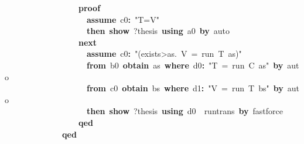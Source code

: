 \documentclass{article}
\newcommand{\syntaxKEYWORDA}[1]{\textcolor[rgb]{0.0,0.4,0.6}{\textbf{#1}}}
\newcommand{\syntaxKEYWORDB}[1]{\textcolor[rgb]{0.0,0.6,0.4}{\textbf{#1}}}
\newcommand{\syntaxKEYWORDC}[1]{\textcolor[rgb]{0.0,0.6,1.0}{\textbf{#1}}}
\newcommand{\syntaxLITERALA}[1]{\textcolor[rgb]{1.0,0.0,0.8}{#1}}
\newcommand{\syntaxOPERATOR}[1]{\textcolor[rgb]{0.0,0.0,0.0}{\textbf{#1}}}
\newcommand{\syntaxKEYWORDA}[1]{\textcolor[rgb]{0.0,0.4,0.6}{\textbf{#1}}}
\newcommand{\syntaxKEYWORDB}[1]{\textcolor[rgb]{0.0,0.6,0.4}{\textbf{#1}}}
\newcommand{\syntaxKEYWORDC}[1]{\textcolor[rgb]{0.0,0.6,1.0}{\textbf{#1}}}
\newcommand{\syntaxLITERALA}[1]{\textcolor[rgb]{1.0,0.0,0.8}{#1}}
\newcommand{\syntaxOPERATOR}[1]{\textcolor[rgb]{0.0,0.0,0.0}{\textbf{#1}}}
\newcommand{\syntaxKEYWORDA}[1]{\textcolor[rgb]{0.0,0.4,0.6}{\textbf{#1}}}
\newcommand{\syntaxKEYWORDB}[1]{\textcolor[rgb]{0.0,0.6,0.4}{\textbf{#1}}}
\newcommand{\syntaxKEYWORDC}[1]{\textcolor[rgb]{0.0,0.6,1.0}{\textbf{#1}}}
\newcommand{\syntaxLITERALA}[1]{\textcolor[rgb]{1.0,0.0,0.8}{#1}}
\newcommand{\syntaxOPERATOR}[1]{\textcolor[rgb]{0.0,0.0,0.0}{\textbf{#1}}}
\newcommand{\syntaxKEYWORDA}[1]{\textcolor[rgb]{0.0,0.4,0.6}{#1}}
\newcommand{\syntaxKEYWORDB}[1]{\textcolor[rgb]{0.0,0.6,0.4}{#1}}
\newcommand{\syntaxKEYWORDC}[1]{\textcolor[rgb]{0.0,0.6,1.0}{#1}}
\newcommand{\syntaxLITERALA}[1]{\textcolor[rgb]{1.0,0.0,0.8}{\textbf{#1}}}
\newcommand{\syntaxOPERATOR}[1]{\textcolor[rgb]{0.0,0.0,0.0}{#1}}
\newcommand{\syntaxKEYWORDA}[1]{\textcolor[rgb]{0.0,0.4,0.6}{\textbf{#1}}}
\newcommand{\syntaxKEYWORDB}[1]{\textcolor[rgb]{0.0,0.6,0.4}{\textbf{#1}}}
\newcommand{\syntaxKEYWORDC}[1]{\textcolor[rgb]{0.0,0.6,1.0}{\textbf{#1}}}
\newcommand{\syntaxLITERALA}[1]{\textcolor[rgb]{1.0,0.0,0.8}{#1}}
\newcommand{\syntaxOPERATOR}[1]{\textcolor[rgb]{0.0,0.0,0.0}{\textbf{#1}}}
\newcommand{\syntaxKEYWORDA}[1]{\textcolor[rgb]{0.0,0.4,0.6}{\textbf{#1}}}
\newcommand{\syntaxKEYWORDB}[1]{\textcolor[rgb]{0.0,0.6,0.4}{\textbf{#1}}}
\newcommand{\syntaxKEYWORDC}[1]{\textcolor[rgb]{0.0,0.6,1.0}{\textbf{#1}}}
\newcommand{\syntaxLITERALA}[1]{\textcolor[rgb]{1.0,0.0,0.8}{#1}}
\newcommand{\syntaxOPERATOR}[1]{\textcolor[rgb]{0.0,0.0,0.0}{\textbf{#1}}}
\begin{document}
{\ }{\ }{\ }{\ }{\ }{\ }{\ }{\ }{\ }{\ }{\ }{\ }{\ }{\ }{\ }{\ }{\ }{\ }\syntaxKEYWORDA{proof}\hspace*{\fill}\\
{\ }{\ }{\ }{\ }{\ }{\ }{\ }{\ }{\ }{\ }{\ }{\ }{\ }{\ }{\ }{\ }{\ }{\ }{\ }{\ }\syntaxKEYWORDC{assume}{\ }c0\syntaxOPERATOR{:}{\ }\syntaxLITERALA{"T=V"}\hspace*{\fill}\\
{\ }{\ }{\ }{\ }{\ }{\ }{\ }{\ }{\ }{\ }{\ }{\ }{\ }{\ }{\ }{\ }{\ }{\ }{\ }{\ }\syntaxKEYWORDA{then}{\ }\syntaxKEYWORDC{show}{\ }?thesis{\ }\syntaxKEYWORDA{using}{\ }a0{\ }\syntaxKEYWORDA{by}{\ }auto{\ }\hspace*{\fill}\\
{\ }{\ }{\ }{\ }{\ }{\ }{\ }{\ }{\ }{\ }{\ }{\ }{\ }{\ }{\ }{\ }{\ }{\ }\syntaxKEYWORDA{next}\hspace*{\fill}\\
{\ }{\ }{\ }{\ }{\ }{\ }{\ }{\ }{\ }{\ }{\ }{\ }{\ }{\ }{\ }{\ }{\ }{\ }{\ }{\ }\syntaxKEYWORDC{assume}{\ }c0\syntaxOPERATOR{:}{\ }\syntaxLITERALA{"(\<exists>as.{\ }V{\ }={\ }run{\ }T{\ }as)"}\hspace*{\fill}\\
{\ }{\ }{\ }{\ }{\ }{\ }{\ }{\ }{\ }{\ }{\ }{\ }{\ }{\ }{\ }{\ }{\ }{\ }{\ }{\ }\syntaxKEYWORDA{from}{\ }b0{\ }\syntaxKEYWORDC{obtain}{\ }as{\ }\syntaxKEYWORDB{where}{\ }d0\syntaxOPERATOR{:}{\ }\syntaxLITERALA{"T{\ }={\ }run{\ }C{\ }as"}{\ }\syntaxKEYWORDA{by}{\ }auto\hspace*{\fill}\\
{\ }{\ }{\ }{\ }{\ }{\ }{\ }{\ }{\ }{\ }{\ }{\ }{\ }{\ }{\ }{\ }{\ }{\ }{\ }{\ }\syntaxKEYWORDA{from}{\ }c0{\ }\syntaxKEYWORDC{obtain}{\ }bs{\ }\syntaxKEYWORDB{where}{\ }d1\syntaxOPERATOR{:}{\ }\syntaxLITERALA{"V{\ }={\ }run{\ }T{\ }bs"}{\ }\syntaxKEYWORDA{by}{\ }auto\hspace*{\fill}\\
{\ }{\ }{\ }{\ }{\ }{\ }{\ }{\ }{\ }{\ }{\ }{\ }{\ }{\ }{\ }{\ }{\ }{\ }{\ }{\ }\syntaxKEYWORDA{then}{\ }\syntaxKEYWORDC{show}{\ }?thesis{\ }\syntaxKEYWORDA{using}{\ }d0{\ }{\ }run\usebox{\underscorebox}trans{\ }\syntaxKEYWORDA{by}{\ }fastforce\hspace*{\fill}\\
{\ }{\ }{\ }{\ }{\ }{\ }{\ }{\ }{\ }{\ }{\ }{\ }{\ }{\ }{\ }{\ }{\ }{\ }\syntaxKEYWORDA{qed}\hspace*{\fill}\\
{\ }{\ }{\ }{\ }{\ }{\ }{\ }{\ }{\ }{\ }{\ }{\ }{\ }{\ }\syntaxKEYWORDA{qed}\hspace*{\fill}\\
\end{document}
